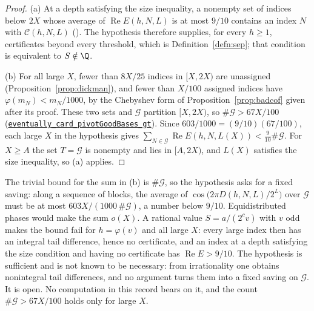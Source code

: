 \begin{proof}
(a) At a depth satisfying the size inequality, a nonempty set of indices
below $2X$ whose average of $\operatorname{Re}E(h,N,L)$ is at most $9/10$
contains an index $N$ with $\mathcal C(h,N,L)$
().
The hypothesis therefore supplies, for every $h\ge1$, certificates beyond
every threshold, which is Definition~\ref{defn:sep}; that condition is
equivalent to $S\notin\Q$.

(b) For all large $X$, fewer than $8X/25$ indices in $[X,2X)$ are
unassigned (Proposition~\ref{prop:dickman}), and fewer than $X/100$
assigned indices have $\varphi(m_N)<m_N/1000$, by the Chebyshev form of
Proposition~\ref{prop:badcof} given after its proof. These two sets and
$\mathcal G$ partition $[X,2X)$, so $\#\mathcal G>67X/100$
(\href{https://github.com/wcook04/plectis-erdos/blob/24edbddbe2bd68e920327a701aad0b9dd0d69675/lean/ErdosProblems/ArgumentGraph/Results/Erdos249Endpoint.lean\#L75}{\texttt{eventually\_card\_pivotGoodBases\_gt}}).
Since $603/1000=(9/10)(67/100)$, each large $X$ in the hypothesis gives
$\sum_{N\in\mathcal G}\operatorname{Re}E(h,N,L(X))<\tfrac{9}{10}\#\mathcal G$.
For $X\ge A$ the set $T=\mathcal G$ is nonempty and lies in $[A,2X)$, and
$L(X)$ satisfies the size inequality, so (a) applies.
\end{proof}

The trivial bound for the sum in (b) is $\#\mathcal G$, so the
hypothesis asks for a fixed saving: along a sequence of blocks, the
average of $\cos\bigl(2\pi D(h,N,L)/2^L\bigr)$ over $\mathcal G$ must be
at most $603X/(1000\,\#\mathcal G)$, a number below $9/10$.
Equidistributed phases would make the sum $o(X)$. A rational value
$S=a/(2^cv)$ with $v$ odd makes the bound fail for $h=\varphi(v)$ and all
large $X$: every large index
then has an integral tail difference, hence no certificate, and an index
at a depth satisfying the size condition and having no certificate has
$\operatorname{Re}E>9/10$.
The hypothesis is sufficient and is not known to be necessary: from
irrationality one obtains nonintegral tail differences, and no argument
turns them into a fixed saving on $\mathcal G$. It is open. No computation in this record bears
on it, and the count $\#\mathcal G>67X/100$ holds only for large $X$.

